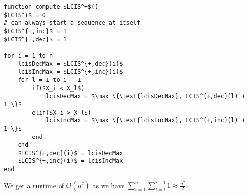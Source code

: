\documentclass{article}
\begin{document}
\begin{enumerate}[a)]
\begin{lstlisting}
function compute-$LCIS^+$()
$LCIS^+$ = 0
# can always start a sequence at itself
$LCIS^{+,inc}$ = 1
$LCIS^{+,dec}$ = 1

for i = 1 to n
    lcisDecMax = $LCIS^{+,dec}(i)$
    lcisIncMax = $LCIS^{+,inc}(i)$
    for l = 1 to i - 1
        if($X_i < X_l$)
            lcisDecMax = $\max \{\text{lcisDecMax}, LCIS^{+,dec}(l) + 1 \}$
        elif($X_i > X_l$)
            lcisIncMax = $\max \{\text{lcisIncMax}, LCIS^{+,inc}(l) + 1 \}$
        end
    end
    $LCIS^{+,dec}(i)$ = lcisDecMax
    $LCIS^{+,inc}(i)$ = lcisIncMax
end

\end{lstlisting}
We get a runtime of $O(n^2)$ as we have $\sum_{i=1}^n \sum_{l=1}^{i-1} 1 \approx \frac{n^2}{2}$



\end{enumerate}
\end{document}
